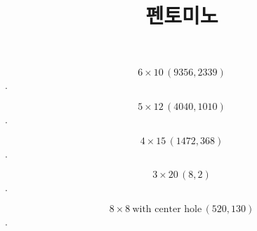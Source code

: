 \documentclass{article}
\title{펜토미노}
\date{}
\author{}
\begin{document}
\maketitle

$$6\times10\,(9356,2339)$$
. %

$$5\times12\, (4040,1010)$$
. %

$$4\times15\, (1472,368)$$
. %

$$3\times20\, (8,2)$$
. %

$$8\times8\ \textrm{with center hole}\, (520,130)$$
. %
\end{document}
